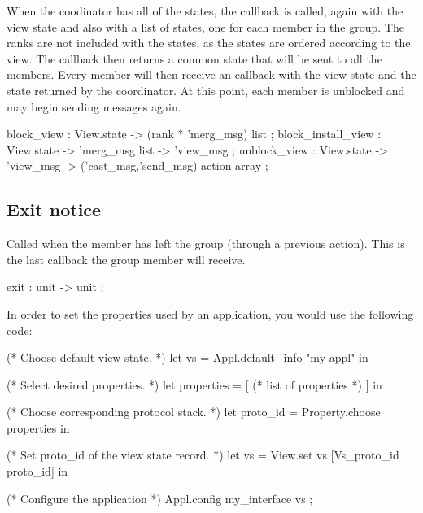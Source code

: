 When the coodinator has all of the states, the  callback
is called, again with the view state and also with a list of states, one for each
member in the group.  The ranks are not included with the states, as the states are
ordered according to the view.  The callback then returns a common state that will be
sent to all the members.  Every member will then receive an 
callback with the view state and the state returned by the coordinator.  At this
point, each member is unblocked and may begin sending messages again.
\begin{codebox}
  block_view            : View.state -> (rank * 'merg_msg) list ;
  block_install_view    : View.state -> 'merg_msg list -> 'view_msg ;
  unblock_view          : View.state -> 'view_msg -> 
    ('cast_msg,'send_msg) action array ;
\end{codebox}



\subsection{Exit notice}
Called when the member has left the group (through a previous 
action).  This is the last callback the group member will receive.
\begin{codebox}
  exit                  : unit -> unit ;
\end{codebox}



In order to set the properties used by an application, you would use the
following code:
\begin{codebox}
  (* Choose default view state.
   *)
  let vs = Appl.default_info "my-appl" in

  (* Select desired properties.
   *)
  let properties = [ (* list of properties *) ] in

  (* Choose corresponding protocol stack.
   *)
  let proto_id = Property.choose properties in

  (* Set proto_id of the view state record.
   *)
  let vs = View.set vs [Vs_proto_id proto_id] in

  (* Configure the application
   *)
  Appl.config my_interface vs ;
\end{codebox}

